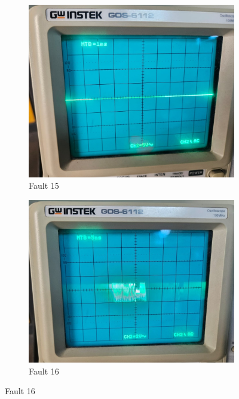 \documentclass[a4paper,12pt]{article}
\begin{document}
\begin{figure}[H]
	\begin{subfigure}[t]{0.44\textwidth}
		\centering
		\includegraphics[width=1\linewidth]{Images/1.15}
		\caption{Fault 15}
		\vspace{0.1cm}
	\end{subfigure}
	\hfil
	\begin{subfigure}[t]{0.44\textwidth}
		\centering
		\includegraphics[width=1\linewidth]{Images/1.16}
		\caption{Fault 16}
		\vspace{0.1cm}
	\end{subfigure}
\end{figure}
\end{document}
